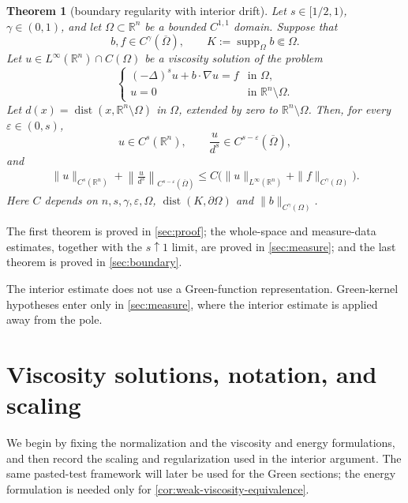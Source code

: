 \documentclass[reqno]{amsart}
\numberwithin{equation}{section}
\theoremstyle{plain}
\newtheorem{theorem}{Theorem}[section]
\theoremstyle{definition}
\theoremstyle{remark}
\newcommand{\R}{\mathbb R}
\newcommand{\rev}[1]{#1}
\begin{document}
\begin{theorem}[boundary regularity with interior drift]\label{thm:boundary-drift}
Let $s\in[1/2,1)$, $\gamma\in(0,1)$, and let $\Omega\subset\R^n$ be a
bounded $C^{1,1}$ domain.  Suppose that
\[
 b,f\in C^\gamma(\overline\Omega),
 \qquad K:=\operatorname{supp}_{\Omega}b\Subset\Omega.
\]
Let $u\in L^\infty(\R^n)\cap C(\Omega)$ be a viscosity solution of
the problem
\begin{equation}\label{eq:dirichlet-drift}
 \begin{cases}
 (-\Delta)^su+b\cdot\nabla u=f&\text{in }\Omega,\\
 u=0&\text{in }\R^n\setminus\Omega.
 \end{cases}
\end{equation}
Let $d(x)=\operatorname{dist}(x,\R^n\setminus\Omega)$ in $\Omega$, extended
by zero to $\R^n\setminus\Omega$.  Then, for every
$\varepsilon\in(0,s)$,
\begin{equation}\label{eq:boundary-drift-estimate}
 u\in C^s(\R^n),
 \qquad \frac{u}{d^s}\in
 C^{s-\varepsilon}(\overline\Omega),
\end{equation}
and
\begin{align}\label{eq:boundary-drift-norm}
 \|u\|_{C^s(\R^n)}
 +\left\|\frac{u}{d^s}\right\|_{C^{s-\varepsilon}(\overline\Omega)}\le C\bigl(
 \|u\|_{L^\infty(\R^n)}+
 \|f\|_{C^\gamma(\Omega)}\bigr).
\end{align}
Here $C$ depends on $n,s,\gamma,\varepsilon,\Omega$,
$\operatorname{dist}(K,\partial\Omega)$ and
$\|b\|_{C^\gamma(\Omega)}$.
\end{theorem}

The first theorem is proved in \cref{sec:proof}; the whole-space and
measure-data estimates, together with the $s\uparrow1$ limit, are proved in
\cref{sec:measure}; and the last theorem is proved in \cref{sec:boundary}.

\rev{The interior estimate does not use a Green-function representation.
Green-kernel hypotheses enter only in \cref{sec:measure}, where the interior
estimate is applied away from the pole.}

\section{Viscosity solutions, notation, and scaling}
\label{sec:preliminaries}

\rev{We begin by fixing the normalization and the viscosity and energy
formulations, and then record the scaling and regularization used in the
interior argument.  The same pasted-test framework will later be used for
the Green sections; the energy formulation is needed only for
\cref{cor:weak-viscosity-equivalence}.}
\end{document}
